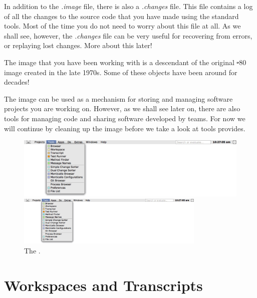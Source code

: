 \documentclass[a4paper,10pt,twoside]{book}
\begin{document}
In addition to the \emph{.image} file, there is also a \emph{.changes} file.
This file contains a log of all the changes to the source code that you have made using the standard tools.
Most of the time you do not need to worry about this file at all.
As we shall see, however, the \emph{.changes} file can be very useful for recovering from errors, or replaying lost changes.
More about this later!

The image that you have been working with is a descendant of the original \st-80 image created in the late 1970s.
Some of these objects have been around for decades!

The image can be used as a mechanism for storing and managing software projects you are working on.
However, as we shall see later on, there are also tools for managing code and sharing software developed by teams.
For now we will continue by cleaning up the image before we take a look at tools \sq provides.

\begin{figure}[htb]
\ifluluelse
	{\centerline {\includegraphics[width=\textwidth]{Tools}}}
	{\centerline {\includegraphics[width=0.8\textwidth]{Tools}}}
\caption{The \sq \toolsmenu.\label{fig:tools}}
\end{figure}

\section{Workspaces and Transcripts}
\label{sec:transcript}
\end{document}
